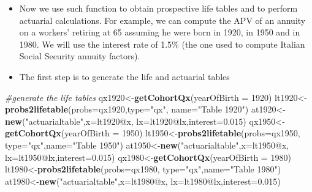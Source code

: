 \documentclass[ignorenonframetext,]{beamer}
\newenvironment{Shaded}{\begin{snugshade}}{\end{snugshade}}
\newcommand{\KeywordTok}[1]{\textcolor[rgb]{0.13,0.29,0.53}{\textbf{{#1}}}}
\newcommand{\DataTypeTok}[1]{\textcolor[rgb]{0.13,0.29,0.53}{{#1}}}
\newcommand{\DecValTok}[1]{\textcolor[rgb]{0.00,0.00,0.81}{{#1}}}
\newcommand{\FloatTok}[1]{\textcolor[rgb]{0.00,0.00,0.81}{{#1}}}
\newcommand{\StringTok}[1]{\textcolor[rgb]{0.31,0.60,0.02}{{#1}}}
\newcommand{\CommentTok}[1]{\textcolor[rgb]{0.56,0.35,0.01}{\textit{{#1}}}}
\newcommand{\NormalTok}[1]{{#1}}
\begin{document}
\begin{frame}[fragile]

\begin{itemize}[<+->]
\itemsep1pt\parskip0pt
\item
  Now we use such function to obtain prospective life tables and to
  perform actuarial calculations. For example, we can compute the APV of
  an annuity on a workers' retiring at 65 assuming he were born in 1920,
  in 1950 and in 1980. We will use the interest rate of 1.5\% (the one
  used to compute Italian Social Security annuity factors).
\item
  The first step is to generate the life and actuarial tables
\end{itemize}

\begin{Shaded}
\begin{Highlighting}[]
\CommentTok{#generate the life tables}
\NormalTok{qx1920<-}\KeywordTok{getCohortQx}\NormalTok{(}\DataTypeTok{yearOfBirth =} \DecValTok{1920}\NormalTok{)}
\NormalTok{lt1920<-}\KeywordTok{probs2lifetable}\NormalTok{(}\DataTypeTok{probs=}\NormalTok{qx1920,}\DataTypeTok{type=}\StringTok{"qx"}\NormalTok{,}
\DataTypeTok{name=}\StringTok{"Table 1920"}\NormalTok{)}
\NormalTok{at1920<-}\KeywordTok{new}\NormalTok{(}\StringTok{"actuarialtable"}\NormalTok{,}\DataTypeTok{x=}\NormalTok{lt1920@x,}
\DataTypeTok{lx=}\NormalTok{lt1920@lx,}\DataTypeTok{interest=}\FloatTok{0.015}\NormalTok{)}
\NormalTok{qx1950<-}\KeywordTok{getCohortQx}\NormalTok{(}\DataTypeTok{yearOfBirth =} \DecValTok{1950}\NormalTok{)}
\NormalTok{lt1950<-}\KeywordTok{probs2lifetable}\NormalTok{(}\DataTypeTok{probs=}\NormalTok{qx1950,}
\DataTypeTok{type=}\StringTok{"qx"}\NormalTok{,}\DataTypeTok{name=}\StringTok{"Table 1950"}\NormalTok{)}
\NormalTok{at1950<-}\KeywordTok{new}\NormalTok{(}\StringTok{"actuarialtable"}\NormalTok{,}\DataTypeTok{x=}\NormalTok{lt1950@x,}
\DataTypeTok{lx=}\NormalTok{lt1950@lx,}\DataTypeTok{interest=}\FloatTok{0.015}\NormalTok{)}
\NormalTok{qx1980<-}\KeywordTok{getCohortQx}\NormalTok{(}\DataTypeTok{yearOfBirth =} \DecValTok{1980}\NormalTok{)}
\NormalTok{lt1980<-}\KeywordTok{probs2lifetable}\NormalTok{(}\DataTypeTok{probs=}\NormalTok{qx1980,}
\DataTypeTok{type=}\StringTok{"qx"}\NormalTok{,}\DataTypeTok{name=}\StringTok{"Table 1980"}\NormalTok{)}
\NormalTok{at1980<-}\KeywordTok{new}\NormalTok{(}\StringTok{"actuarialtable"}\NormalTok{,}\DataTypeTok{x=}\NormalTok{lt1980@x,}
\DataTypeTok{lx=}\NormalTok{lt1980@lx,}\DataTypeTok{interest=}\FloatTok{0.015}\NormalTok{)}
\end{Highlighting}
\end{Shaded}

\end{frame}
\end{document}
